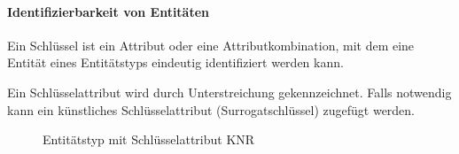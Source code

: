 \begin{frame}[t]{\insertsection}
\framesubtitle{Identifizierbarkeit von Entitäten}
\begin{definition}[Schlüssel]
Ein Schlüssel ist ein Attribut oder eine Attributkombination, mit dem eine Entität eines Entitätstyps eindeutig identifiziert 
werden kann.\label{def:er:key}
\end{definition}
\onslide\pause
\abs
Ein Schlüsselattribut wird durch Unterstreichung gekennzeichnet. Falls notwendig kann ein 
künstliches Schlüsselattribut (Surrogatschlüssel) zugefügt werden.
\begin{figure}
\caption{Entitätstyp mit Schlüsselattribut KNR}
\end{figure}		
\end{frame}


